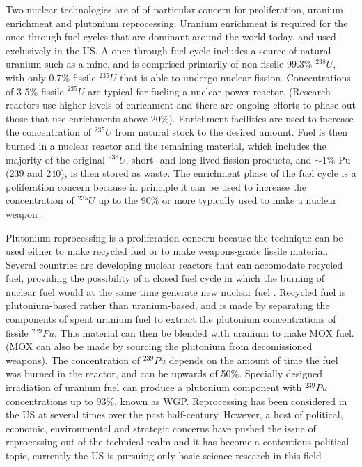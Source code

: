 Two nuclear technologies are of of particular concern for proliferation, uranium enrichment and plutonium reprocessing.  Uranium enrichment is required for the once-through fuel cycles that are dominant around the world today, and used exclusively in the \gls{US}.  A once-through fuel cycle includes a source of natural uranium such as a mine, and is comprised primarily of non-fissile 99.3\% $^{238}U$, with only 0.7\% fissile $^{235}U$ that is able to undergo nuclear fission. Concentrations of 3-5\% fissile $^{235}U$ are typical for fueling a nuclear power reactor.  (Research reactors use higher levels of enrichment and there are ongoing efforts to phase out those that use enrichments above 20\%).  Enrichment facilities are used to increase the concentration of $^{235}U$ from natural stock to the desired amount.  Fuel is then burned in a nuclear reactor and the remaining material, which includes the majority of the original $^{238}U$, short- and long-lived fission products, and $\sim$1\% Pu (239 and 240), is then stored as waste.  The enrichment phase of the fuel cycle is a poliferation concern because in principle it can be used to increase the concentration of $^{235}U$ up to the 90\% or more typically used to make a nuclear weapon \cite{_military_2014}.

Plutonium reprocessing is a proliferation concern because the technique can be used either to make recycled fuel or to make weapons-grade fissile material.  Several countries are developing nuclear reactors that can accomodate recycled fuel, providing the possibility of a closed fuel cycle in which the burning of nuclear fuel would at the same time generate new nuclear fuel \cite{_processing_2015}.  Recycled fuel is plutonium-based rather than uranium-based, and is made by separating the components of spent uranium fuel to extract the plutonium concentrations of fissile $^{239}Pu$. This material can then be blended with uranium to make \gls{MOX} fuel. (\gls{MOX} can also be made by sourcing the plutonium from decomissioned weapons). The concentration of $^{239}Pu$ depends on the amount of time the fuel was burned in the reactor, and can be upwards of 50\%.  Specially designed irradiation of uranium fuel can produce a plutonium component with $^{239}Pu$ concentrations up to 93\%, known as \gls{WGP}.  Reprocessing has been considered in the \gls{US} at several times over the past half-century.  However, a host of political, economic, environmental and strategic concerns have pushed the issue of reprocessing out of the technical realm and it has become a contentious political topic, currently the \gls{US} is pursuing only basic science research in this field \cite{rossin_policy_????, editorial_adieu_2009}.

